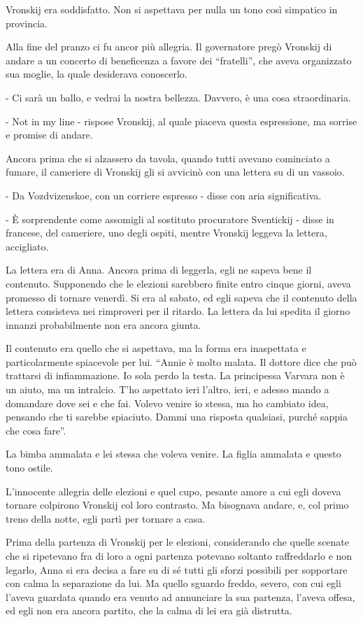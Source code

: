 Vronskij era soddisfatto. Non si aspettava per nulla un tono così simpatico in provincia. 

Alla fine del pranzo ci fu ancor più allegria. Il governatore pregò Vronskij di andare a un concerto di beneficenza a favore dei ``fratelli'', che aveva organizzato sua moglie, la quale desiderava conoscerlo. 

- Ci sarà un ballo, e vedrai la nostra bellezza. Davvero, è una cosa straordinaria. 

- Not in my line - rispose Vronskij, al quale piaceva questa espressione, ma sorrise e promise di andare. 

Ancora prima che si alzassero da tavola, quando tutti avevano cominciato a fumare, il cameriere di Vronskij gli si avvicinò con una lettera su di un vassoio. 

- Da Vozdvizenskoe, con un corriere espresso - disse con aria significativa. 

- È sorprendente come assomigli al sostituto procuratore Sventickij - disse in francese, del cameriere, uno degli ospiti, mentre Vronskij leggeva la lettera, accigliato. 

La lettera era di Anna. Ancora prima di leggerla, egli ne sapeva bene il contenuto. Supponendo che le elezioni sarebbero finite entro cinque giorni, aveva promesso di tornare venerdì. Si era al sabato, ed egli sapeva che il contenuto della lettera consisteva nei rimproveri per il ritardo. La lettera da lui spedita il giorno innanzi probabilmente non era ancora giunta. 

Il contenuto era quello che si aspettava, ma la forma era inaspettata e particolarmente spiacevole per lui. ``Annie è molto malata. Il dottore dice che può trattarsi di infiammazione. Io sola perdo la testa. La principessa Varvara non è un aiuto, ma un intralcio. T'ho aspettato ieri l'altro, ieri, e adesso mando a domandare dove sei e che fai. Volevo venire io stessa, ma ho cambiato idea, pensando che ti sarebbe spiaciuto. Dammi una risposta qualsiasi, purché sappia che cosa fare''. 

La bimba ammalata e lei stessa che voleva venire. La figlia ammalata e questo tono ostile. 

L'innocente allegria delle elezioni e quel cupo, pesante amore a cui egli doveva tornare colpirono Vronskij col loro contrasto. Ma bisognava andare, e, col primo treno della notte, egli partì per tornare a casa. 

\label{xxxii-4} 

Prima della partenza di Vronskij per le elezioni, considerando che quelle scenate che si ripetevano fra di loro a ogni partenza potevano soltanto raffreddarlo e non legarlo, Anna si era decisa a fare su di sé tutti gli sforzi possibili per sopportare con calma la separazione da lui. Ma quello sguardo freddo, severo, con cui egli l'aveva guardata quando era venuto ad annunciare la sua partenza, l'aveva offesa, ed egli non era ancora partito, che la calma di lei era già distrutta. 

